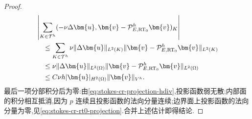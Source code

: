\begin{proof}
\begin{align}
  &\left|\sum_{K\in\mathcal{T}^h}
       (-\nu\Delta\bm{u},
          \bm{v}-\mathcal{P}_{E,\mathrm{RT}_0}^h\bm{v})_K\right|\\
  &\quad\leq
       \sum_{K\in\mathcal{T}^h}
       \nu\|\Delta\bm{u}\|_{L^2(K)}
       \|\bm{v}-\mathcal{P}_{E,\mathrm{RT}_0}^h\bm{v}\|_{L^2(K)}
       \notag\\
  &\quad\leq
       \nu\|\Delta\bm{u}\|_{L^2(\Omega)}
       \|\bm{v}-\mathcal{P}_{E,\mathrm{RT}_0}^h\bm{v}\|_{L^2(\Omega)}
       \notag\\
  &\quad\leq C\nu h|\bm{u}|_{H^2(\Omega)}
       \|\bm{v}\|_{V^h}.\notag
\end{align}
最后一项分部积分后为零:由\cref{eq:stokes-cr-projection-hdiv},投影函数弱无散;内部面的积分相互抵消,因为 $p$ 连续且投影函数的法向分量连续;边界面上投影函数的法向分量为零,见\cref{eq:stokes-cr-rt0-projection}.合并上述估计即得结论.
\end{proof}

